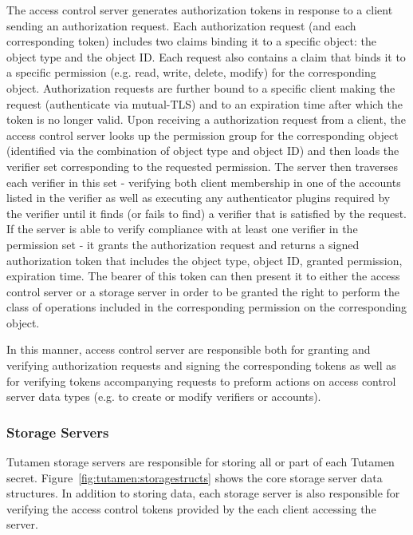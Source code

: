 The access control server generates authorization tokens in response
to a client sending an authorization request. Each authorization
request (and each corresponding token) includes two claims binding it
to a specific object: the object type and the object ID. Each request
also contains a claim that binds it to a specific permission
(e.g. read, write, delete, modify) for the corresponding
object. Authorization requests are further bound to a specific client
making the request (authenticate via mutual-TLS) and to an expiration
time after which the token is no longer valid. Upon receiving a
authorization request from a client, the access control server looks
up the permission group for the corresponding object (identified via
the combination of object type and object ID) and then loads the
verifier set corresponding to the requested permission. The server
then traverses each verifier in this set - verifying both client
membership in one of the accounts listed in the verifier as well as
executing any authenticator plugins required by the verifier until it
finds (or fails to find) a verifier that is satisfied by the
request. If the server is able to verify compliance with at least one
verifier in the permission set - it grants the authorization request
and returns a signed authorization token that includes the object
type, object ID, granted permission, expiration time. The bearer of
this token can then present it to either the access control server or
a storage server in order to be granted the right to perform the class
of operations included in the corresponding permission on the
corresponding object.

In this manner, access control server are responsible both for
granting and verifying authorization requests and signing the
corresponding tokens as well as for verifying tokens accompanying
requests to preform actions on access control server data types
(e.g. to create or modify verifiers or accounts).

\subsubsection{Storage Servers}

Tutamen storage servers are responsible for storing all or part of
each Tutamen secret. Figure~\ref{fig:tutamen:storagestructs} shows the
core storage server data structures. In addition to storing data, each
storage server is also responsible for verifying the access control
tokens provided by the each client accessing the server.

